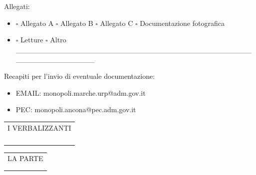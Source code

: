 \documentclass[12pt]{article}
\makeatletter
\newcommand\signature{%
  \par\vspace{8ex}\noindent
  \begin{tabular}[t]{@{}c@{}}
    I VERBALIZZANTI\\ \\
    \makebox[15em]{\dotfill}\\
    \\
    \makebox[15em]{\dotfill}
  \end{tabular}
  \hfill
  \begin{tabular}[t]{@{}c@{}}
    LA PARTE\\ \\
    \makebox[15em]{\dotfill}
  \end{tabular}
}
\makeatother
\begin{document}
Allegati: 
\begin{itemize}[label={}]
    \item \begin{math}\square\end{math} Allegato A \begin{math}\square\end{math} Allegato B \begin{math}\square\end{math} Allegato C \begin{math}\square\end{math} Documentazione fotografica
    \item \begin{math}\square\end{math} Letture \begin{math}\square\end{math} Altro \_\_\_\_\_\_\_\_\_\_\_\_\_\_\_\_\_\_\_\_\_\_\_\_\_\_\_\_\_\_\_\_\_\_\_\_\_\_\_\_\_\_\_\_\_\_\_\_\_\_\_\_\_\_\_\_\_\_\_\_
\end{itemize}

Recapiti per l'invio di eventuale documentazione:
\begin{itemize}[label={}]
    \item EMAIL: monopoli.marche.urp@adm.gov.it
    \item PEC: monopoli.ancona@pec.adm.gov.it
\end{itemize}

\signature
\end{document}
